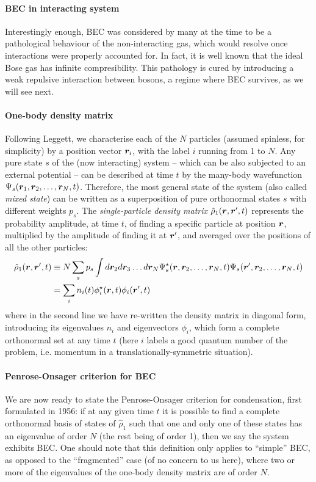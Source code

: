 \paragraph{BEC in interacting system}
Interestingly enough, BEC was considered by many at the time to be a
pathological behaviour of the non-interacting gas, which would resolve
once interactions were properly accounted for. In fact, it is well
known that the ideal Bose gas has infinite compresibility.  This
pathology is cured by introducing a weak repulsive interaction between
bosons, a regime where BEC survives, as we will see next.

\paragraph{One-body density matrix}
Following Leggett, we characterise each of the $N$ particles (assumed
spinless, for simplicity) by a position vector $\bm{r}_i$, with the label
$i$ running from 1 to $N$. Any pure state $s$ of the (now interacting)
system -- which can be also subjected to an external potential -- can
be described at time $t$ by the many-body wavefunction
$\Psi_s(\bm{r}_1,\bm{r}_2,\dots,\bm{r}_N,t)$. Therefore, the most general state
of the system (also called \textit{mixed state}) can be written as a
superposition of pure orthonormal states $s$ with different weights
$p_s$. The \textit{single-particle density matrix}
$\hat{\rho}_1(\bm{r},\bm{r}^{\prime},t)$ represents the probability
amplitude, at time $t$, of finding a specific particle at position
$\bm{r}$, multiplied by the amplitude of finding it at $\bm{r}^{\prime}$,
and averaged over the positions of all the other particles:
%
\begin{align}\label{eq:one-particle-rho}
  \hat{\rho}_1(\bm{r},\bm{r}^{\prime},t) & \equiv N \sum_s p_s \int d\bm{r}_2d\bm{r}_3\dots
d\bm{r}_N
\Psi_s^{\star}(\bm{r},\bm{r}_2,\dots,\bm{r}_N,t)\Psi_s(\bm{r}^{\prime},\bm{r}_2,\dots,\bm{r}_N,t)\nonumber\\
& = \sum_i n_i(t) \phi_i^{\star}(\bm{r},t) \phi_i(\bm{r}^{\prime},t)
\end{align}
% 
where in the second line we have re-written the density matrix in
diagonal form, introducing its eigenvalues $n_i$ and eigenvectors
$\phi_i$, which form a complete orthonormal set at any time $t$ (here
$i$ labels a good quantum number of the problem, i.e. momentum in a
translationally-symmetric situation).

\paragraph{Penrose-Onsager criterion for BEC}
We are now ready to state the Penrose-Onsager criterion for
condensation, first formulated in 1956: if at any given time $t$ it is
possible to find a complete orthonormal basis of states of
$\hat{\rho}_1$ such that one and only one of these states has an
eigenvalue of order $N$ (the rest being of order 1), then we say the
system exhibits BEC. One should note that this definition only applies
to ``simple'' BEC, as opposed to the ``fragmented'' case (of no
concern to us here), where two or more of the eigenvalues of the
one-body density matrix are of order $N$.

